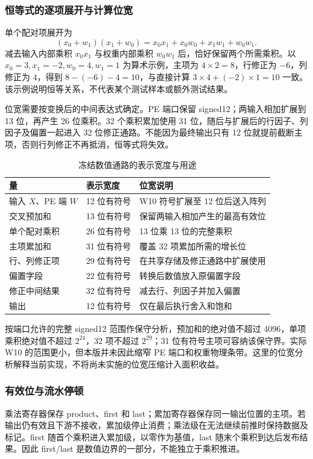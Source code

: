 \subsubsection{恒等式的逐项展开与计算位宽}
单个配对项展开为
\[
(x_0+w_1)(x_1+w_0)=x_0x_1+x_0w_0+x_1w_1+w_0w_1.
\]
减去输入内部乘积 $x_0x_1$ 与权重内部乘积 $w_0w_1$ 后，恰好保留两个所需乘积。以 $x_0=3,x_1=-2,w_0=4,w_1=1$ 为算术示例，主项为 $4\times2=8$，行修正为 $-6$，列修正为 $4$，得到 $8-(-6)-4=10$，与直接计算 $3\times4+(-2)\times1=10$ 一致。该示例说明恒等关系，不代表某个测试样本或额外测试结果。

位宽需要按变换后的中间表达式确定。PE 端口保留 signed12；两输入相加扩展到 13 位，再产生 26 位乘积。32 个乘积累加使用 31 位，随后与扩展后的行因子、列因子及偏置一起进入 32 位修正通路。不能因为最终输出只有 12 位就提前截断主项，否则行列修正不再抵消，恒等式将失效。

\begin{table}[H]\centering\small
\caption{冻结数值通路的表示宽度与用途}
\begin{tabularx}{\linewidth}{p{34mm}p{24mm}Y}\toprule
量 & 表示宽度 & 位宽说明\\\midrule
输入 $X$、PE 端 $W$ & 12 位有符号 & W10 符号扩展至 12 位后送入阵列\\
交叉预加和 & 13 位有符号 & 保留两输入相加产生的最高有效位\\
单个配对乘积 & 26 位有符号 & 13 位乘 13 位的完整乘积\\
主项累加和 & 31 位有符号 & 覆盖 32 项累加所需的增长位\\
行、列修正项 & 29 位有符号 & 在共享存储及修正通路中扩展使用\\
偏置字段 & 22 位有符号 & 转换后数值放入原偏置字段\\
修正中间结果 & 32 位有符号 & 减去行、列因子并加入偏置\\
输出 & 12 位有符号 & 仅在最后执行舍入和饱和\\\bottomrule
\end{tabularx}
\end{table}

按端口允许的完整 signed12 范围作保守分析，预加和的绝对值不超过 4096，单项乘积绝对值不超过 $2^{24}$，32 项不超过 $2^{29}$；31 位有符号主项可容纳该保守界。实际 W10 的范围更小，但本版并未因此缩窄 PE 端口和权重物理条带。这里的位宽分析解释当前实现，不将尚未实施的位宽压缩计入面积收益。

\subsubsection{有效位与流水停顿}
乘法寄存器保存 product、first 和 last；累加寄存器保存同一输出位置的主项。若输出仍有效且下游不接收，累加级停止消费；乘法级在无法继续前推时保持数据及标记。first 随首个乘积进入累加级，以零作为基值，last 随末个乘积到达后发布结果。因此 first/last 是数值边界的一部分，不能独立于乘积推进。

